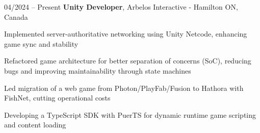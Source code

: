 \begin{twocolentry}{
    04/2024 – Present
}
\fontsize{11 pt}{11 pt}\textbf{Unity Developer}, Arbelos Interactive - Hamilton ON, Canada \end{twocolentry}

\vspace{0.10 cm}
\begin{onecolentry}
   \begin{highlights}
       \item Implemented server-authoritative networking using Unity Netcode, enhancing game sync and stability
       \item Refactored game architecture for better separation of concerns (SoC), reducing bugs and improving maintainability through state machines
       \item Led migration of a web game from Photon/PlayFab/Fusion to Hathora with FishNet, cutting operational costs
       \item Developing a TypeScript SDK with PuerTS for dynamic runtime game scripting and content loading
   \end{highlights}
\end{onecolentry}